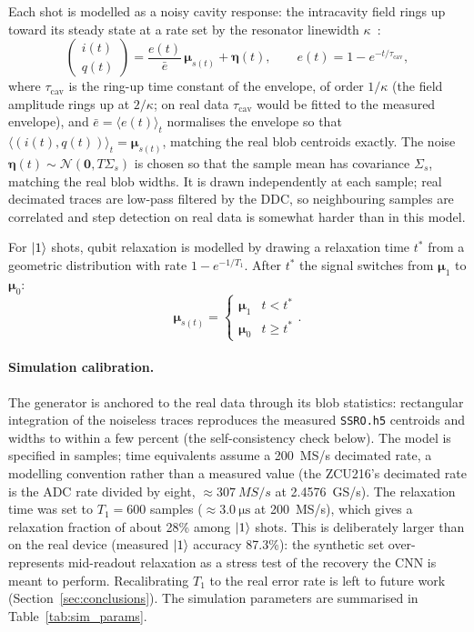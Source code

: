 Each shot is modelled as a noisy cavity response: the intracavity field rings up
toward its steady state at a rate set by the resonator linewidth
$\kappa$~\cite{Blais2021,Gambetta2007}:
\begin{equation}
  \begin{pmatrix}i(t) \\ q(t)\end{pmatrix}
  = \frac{e(t)}{\bar{e}}\,\boldsymbol{\mu}_{s(t)} + \boldsymbol{\eta}(t),
  \qquad e(t) = 1 - e^{-t/\tau_\text{cav}},
\label{eq:trace_model}
\end{equation}
where $\tau_\text{cav}$ is the ring-up time constant of the envelope, of order
$1/\kappa$ (the field amplitude rings up at $2/\kappa$; on real data
$\tau_\text{cav}$ would be fitted to the measured envelope), and
$\bar{e} = \langle e(t)\rangle_t$ normalises the envelope so that
$\langle(i(t), q(t))\rangle_t = \boldsymbol{\mu}_{s(t)}$, matching the real blob
centroids exactly.  The noise $\boldsymbol{\eta}(t) \sim \mathcal{N}(\mathbf{0},
T\Sigma_s)$ is chosen so that the sample mean has covariance $\Sigma_s$, matching
the real blob widths.  It is drawn independently at each sample; real decimated
traces are low-pass filtered by the DDC, so neighbouring samples are correlated
and step detection on real data is somewhat harder than in this model.

For $\ket{1}$ shots, qubit relaxation is modelled by drawing a relaxation time
$t^*$ from a geometric distribution with rate $1 - e^{-1/T_1}$.  After $t^*$ the
signal switches from $\boldsymbol{\mu}_1$ to $\boldsymbol{\mu}_0$:
\begin{equation}
  \boldsymbol{\mu}_{s(t)} =
  \begin{cases}
    \boldsymbol{\mu}_1 & t < t^* \\
    \boldsymbol{\mu}_0 & t \geq t^*
  \end{cases}.
\end{equation}


\paragraph{Simulation calibration.}
The generator is anchored to the real data through its blob statistics: rectangular
integration of the noiseless traces reproduces the measured \texttt{SSRO.h5}
centroids and widths to within a few percent (the self-consistency check below).
The model is specified in samples; time equivalents assume a \SI{200}{MS/s}
decimated rate, a modelling convention rather than a measured value (the ZCU216's
decimated rate is the ADC rate divided by eight, ${\approx}\SI{307}{MS/s}$ at
\SI{2.4576}{GS/s}).
The relaxation time was set to $T_1 = 600$ samples ($\approx\SI{3.0}{\micro\second}$
at \SI{200}{MS/s}), which gives a relaxation fraction of about 28\% among $\ket{1}$
shots.  This is deliberately larger than on the real device (measured $\ket{1}$
accuracy 87.3\%): the
synthetic set over-represents mid-readout relaxation as a stress test of the
recovery the CNN is meant to perform.  Recalibrating $T_1$ to the real error rate
is left to future work (Section~\ref{sec:conclusions}).  The simulation
parameters are summarised in Table~\ref{tab:sim_params}.

